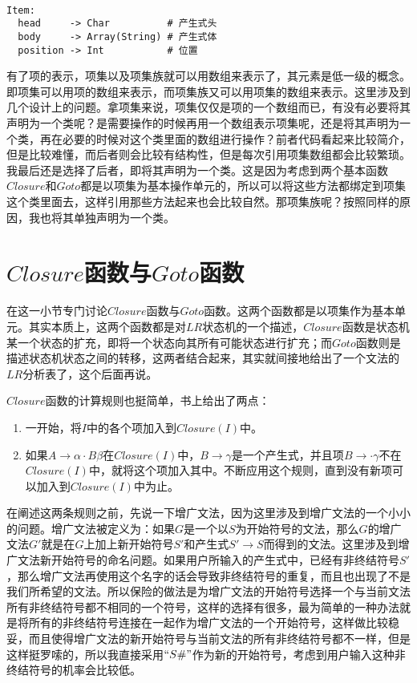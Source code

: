 \begin{verbatim}

Item:
  head     -> Char          # 产生式头
  body     -> Array(String) # 产生式体
  position -> Int           # 位置
\end{verbatim}

有了项的表示，项集以及项集族就可以用数组来表示了，其元素是低一级的概念。即项集可以用项的数组来表示，而项集族又可以用项集的数组来表示。这里涉及到几个设计上的问题。拿项集来说，项集仅仅是项的一个数组而已，有没有必要将其声明为一个类呢？是需要操作的时候再用一个数组表示项集呢，还是将其声明为一个类，再在必要的时候对这个类里面的数组进行操作？前者代码看起来比较简介，但是比较难懂，而后者则会比较有结构性，但是每次引用项集数组都会比较繁琐。我最后还是选择了后者，即将其声明为一个类。这是因为考虑到两个基本函数$Closure$和$Goto$都是以项集为基本操作单元的，所以可以将这些方法都绑定到项集这个类里面去，这样引用那些方法起来也会比较自然。那项集族呢？按照同样的原因，我也将其单独声明为一个类。

\section{$Closure$函数与$Goto$函数}

在这一小节专门讨论$Closure$函数与$Goto$函数。这两个函数都是以项集作为基本单元。其实本质上，这两个函数都是对$LR$状态机的一个描述，$Closure$函数是状态机某一个状态的扩充，即将一个状态向其所有可能状态进行扩充；而$Goto$函数则是描述状态机状态之间的转移，这两者结合起来，其实就间接地给出了一个文法的$LR$分析表了，这个后面再说。

$Closure$函数的计算规则也挺简单，书上给出了两点：

\begin{enumerate}
    \item 一开始，将$I$中的各个项加入到$Closure(I)$中。
    \item 如果$A \rightarrow \alpha \cdot B \beta$在$Closure(I)$中，$B \rightarrow \gamma$是一个产生式，并且项$B \rightarrow \cdot \gamma$不在$Closure(I)$中，就将这个项加入其中。不断应用这个规则，直到没有新项可以加入到$Closure(I)$中为止。
\end{enumerate}

在阐述这两条规则之前，先说一下增广文法，因为这里涉及到增广文法的一个小小的问题。增广文法被定义为：如果$G$是一个以$S$为开始符号的文法，那么$G$的增广文法$G'$就是在$G$上加上新开始符号$S'$和产生式$S' \rightarrow S$而得到的文法。这里涉及到增广文法新开始符号的命名问题。如果用户所输入的产生式中，已经有非终结符号$S'$，那么增广文法再使用这个名字的话会导致非终结符号的重复，而且也出现了不是我们所希望的文法。所以保险的做法是为增广文法的开始符号选择一个与当前文法所有非终结符号都不相同的一个符号，这样的选择有很多，最为简单的一种办法就是将所有的非终结符号连接在一起作为增广文法的一个开始符号，这样做比较稳妥，而且使得增广文法的新开始符号与当前文法的所有非终结符号都不一样，但是这样挺罗嗦的，所以我直接采用$``S\#"$作为新的开始符号，考虑到用户输入这种非终结符号的机率会比较低。

